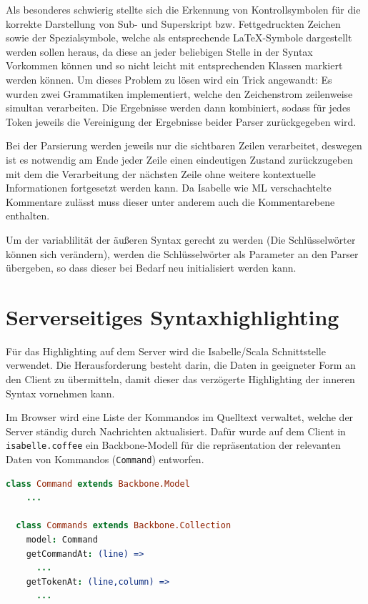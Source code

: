 Als besonderes schwierig stellte sich die Erkennung von Kontrollsymbolen für die korrekte
Darstellung von Sub- und Superskript bzw. Fettgedruckten Zeichen sowie der Spezialsymbole, welche
als entsprechende LaTeX-Symbole dargestellt werden sollen heraus, da diese an jeder beliebigen
Stelle in der Syntax Vorkommen können und so nicht leicht mit entsprechenden Klassen markiert werden
können. Um dieses Problem zu lösen wird ein Trick angewandt: Es wurden zwei Grammatiken
implementiert, welche den Zeichenstrom zeilenweise simultan verarbeiten. Die Ergebnisse werden dann
kombiniert, sodass für jedes Token jeweils die Vereinigung der Ergebnisse beider Parser
zurückgegeben wird.

Bei der Parsierung werden jeweils nur die sichtbaren Zeilen verarbeitet, deswegen ist es notwendig
am Ende jeder Zeile einen eindeutigen Zustand zurückzugeben mit dem die Verarbeitung der nächsten
Zeile ohne weitere kontextuelle Informationen fortgesetzt werden kann. Da Isabelle wie ML
verschachtelte Kommentare zulässt muss dieser unter anderem auch die Kommentarebene enthalten.

Um der variablilität der äußeren Syntax gerecht zu werden (Die Schlüsselwörter können sich
verändern), werden die Schlüsselwörter als Parameter an den Parser übergeben, so dass dieser bei
Bedarf neu initialisiert werden kann.

\section{Serverseitiges Syntaxhighlighting}
\label{sec:ssyntax}

Für das Highlighting auf dem Server wird die Isabelle/Scala Schnittstelle verwendet. Die
Herausforderung besteht darin, die Daten in geeigneter Form an den Client zu übermitteln, damit
dieser das verzögerte Highlighting der inneren Syntax vornehmen kann.

Im Browser wird eine Liste der Kommandos im Quelltext verwaltet, welche der Server ständig durch
Nachrichten aktualisiert. Dafür wurde auf dem Client in \texttt{isabelle.coffee} ein Backbone-Modell
für die repräsentation der relevanten Daten von Kommandos (\texttt{Command}) entworfen.

\begin{lstlisting}[language=coffee]
  class Command extends Backbone.Model
    ...

  class Commands extends Backbone.Collection
    model: Command    
    getCommandAt: (line) => 
      ...
    getTokenAt: (line,column) =>
      ...
\end{lstlisting}

